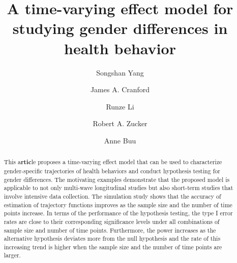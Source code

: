 
\frenchspacing

\begin{frontmatter}



\title{A time-varying effect model for studying gender differences in health behavior}


\newcommand{\artinfo}{\sffamily\fontsize{7pt}{8pt}\selectfont%
Statistical Methods in Medical Research\\
2015, Vol. 00(0) 00-00\\
\copyright\,The Author(s) 2014\\
Reprints and permission:\\ 
sagepub.co.uk/journalsPermissions.nav\\
DOI: 10.1177/0000000000000000\\
smm.sagepub.com\\
\texttt{[image: SAGE\_Logo.eps]}
}

\author{Songshan Yang}
\author{James A. Cranford}
\author{Runze Li}
\author{Robert A. Zucker}
\author{Anne Buu%
}

{}
{}

\begin{abstract}
This a\textbf{rtic}le proposes a time-varying effect model that can be used
to characterize gender-specific trajectories of health behaviors
and conduct hypothesis testing for gender differences. The
motivating examples demonstrate that the proposed model is
applicable to not only multi-wave longitudinal studies but also
short-term studies that involve intensive data collection. The
simulation study shows that the accuracy of estimation of
trajectory functions improves as the sample size and the number of
time points increase. In terms of the performance of the 
hypothesis testing, the type I error rates are close to their
corresponding significance levels under all combinations of sample
size and number of time points. Furthermore, the power increases
as the alternative hypothesis deviates more from the null
hypothesis and the rate of this increasing trend is higher when
the sample size and the number of time points are larger.
\end{abstract}


\end{frontmatter}
